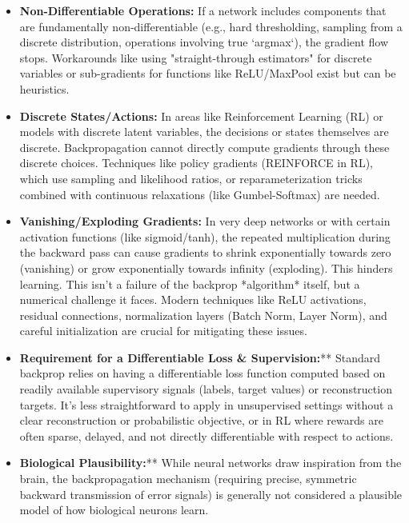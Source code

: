 \documentclass{article}
\begin{document}
\begin{itemize}
    \item \textbf{Non-Differentiable Operations:} If a network includes components that are fundamentally non-differentiable (e.g., hard thresholding, sampling from a discrete distribution, operations involving true `argmax`), the gradient flow stops. Workarounds like using "straight-through estimators" for discrete variables or sub-gradients for functions like ReLU/MaxPool exist but can be heuristics.
    \item \textbf{Discrete States/Actions:} In areas like Reinforcement Learning (RL) or models with discrete latent variables, the decisions or states themselves are discrete. Backpropagation cannot directly compute gradients through these discrete choices. Techniques like policy gradients (REINFORCE in RL), which use sampling and likelihood ratios, or reparameterization tricks combined with continuous relaxations (like Gumbel-Softmax) are needed.
    \item \textbf{Vanishing/Exploding Gradients:} In very deep networks or with certain activation functions (like sigmoid/tanh), the repeated multiplication during the backward pass can cause gradients to shrink exponentially towards zero (vanishing) or grow exponentially towards infinity (exploding). This hinders learning. This isn't a failure of the backprop *algorithm* itself, but a numerical challenge it faces. Modern techniques like ReLU activations, residual connections, normalization layers (Batch Norm, Layer Norm), and careful initialization are crucial for mitigating these issues.
    \item \textbf{Requirement for a Differentiable Loss \& Supervision:}** Standard backprop relies on having a differentiable loss function computed based on readily available supervisory signals (labels, target values) or reconstruction targets. It's less straightforward to apply in unsupervised settings without a clear reconstruction or probabilistic objective, or in RL where rewards are often sparse, delayed, and not directly differentiable with respect to actions.
    \item \textbf{Biological Plausibility:}** While neural networks draw inspiration from the brain, the backpropagation mechanism (requiring precise, symmetric backward transmission of error signals) is generally not considered a plausible model of how biological neurons learn.
\end{itemize}
\end{document}
